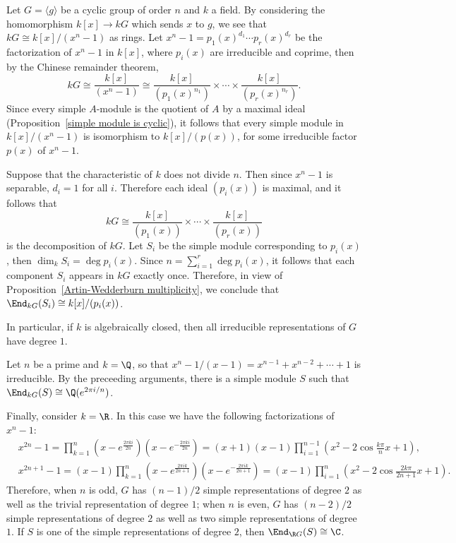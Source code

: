 \begin{example}\label{representation cyclic group eg}
Let $G=\langle g\rangle$ be a cyclic group of order $n$ and $k$ a field. By considering the homomorphism $k[x]\to kG$ which sends $x$ to $g$, we see that $kG\cong k[x]/(x^n-1)$ as rings. Let $x^n-1=p_1(x)^{d_1}\cdots p_r(x)^{d_r}$ be the factorization of $x^n-1$ in $k[x]$, where $p_i(x)$ are irreducible and coprime, then by the Chinese remainder theorem,
\[kG\cong\frac{k[x]}{(x^n-1)}\cong\frac{k[x]}{(p_1(x)^{n_1})}\times\cdots\times\frac{k[x]}{(p_r(x)^{n_r})}.\]
Since every simple $A$-module is the quotient of $A$ by a maximal ideal (Proposition~\ref{simple module is cyclic}), it follows that every simple module in $k[x]/(x^n-1)$ is isomorphism to $k[x]/(p(x))$, for some irreducible factor $p(x)$ of $x^n-1$.\par
Suppose that the characteristic of $k$ does not divide $n$. Then since $x^n-1$ is separable, $d_i=1$ for all $i$. Therefore each ideal $(p_i(x))$ is maximal, and it follows that
\[kG\cong\frac{k[x]}{(p_1(x))}\times\cdots\times\frac{k[x]}{(p_r(x))}\]
is the decomposition of $kG$. Let $S_i$ be the simple module corresponding to $p_i(x)$, then $\dim_kS_i=\deg p_i(x)$. Since $n=\sum_{i=1}^{r}\deg p_i(x)$, it follows that each component $S_i$ appears in $kG$ exactly once. Therefore, in view of Proposition~\ref{Artin-Wedderburn multiplicity}, we conclude that $\End_{kG}(S_i)\cong k[x]/(p_i(x))$.\par
In particular, if $k$ is algebraically closed, then all irreducible representations of $G$ have degree $1$.\par
Let $n$ be a prime and $k=\Q$, so that $x^n-1/(x-1)=x^{n-1}+x^{n-2}+\cdots+1$ is irreducible. By the preceeding arguments, there is a simple module $S$ such that $\End_{kG}(S)\cong\Q(e^{2\pi i/n})$.\par
Finally, consider $k=\R$. In this case we have the following factorizations of $x^n-1$:
\begin{align*}
&x^{2n}-1=\prod_{k=1}^{n}(x-e^{\frac{2\pi ki}{2n}})(x-e^{-\frac{2\pi ki}{2n}})=(x+1)(x-1)\prod_{i=1}^{n-1}(x^2-2\cos\frac{k\pi}{n}x+1),\\
&x^{2n+1}-1=(x-1)\prod_{k=1}^{n}(x-e^{\frac{2\pi ik}{2n+1}})(x-e^{-\frac{2\pi ik}{2n+1}})=(x-1)\prod_{i=1}^{n}(x^2-2\cos\frac{2k\pi}{2n+1}x+1).
\end{align*}
Therefore, when $n$ is odd, $G$ has $(n-1)/2$ simple representations of degree $2$ as well as the trivial representation of degree $1$; when $n$ is even, $G$ has $(n-2)/2$ simple representations of degree $2$ as well as two simple representations of degree $1$. If $S$ is one of the simple representations of degree $2$, then $\End_{\R G}(S)\cong\C$.
\end{example}
